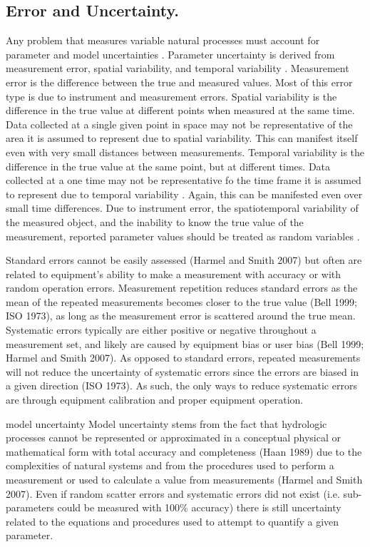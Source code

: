 \begin{linenumbers}
\section{Error and Uncertainty.}
\label{sec:ErrorAndUncertainty}

Any problem that measures variable natural processes must account for parameter and model uncertainties \parencite{vicens1975}.  Parameter uncertainty is derived from measurement error, spatial variability, and temporal variability \parencite{herschy2002}.  Measurement error is the difference between the true and measured values.  Most of this error type is due to instrument and measurement errors.    Spatial variability is the difference in the true value at different points when measured at the same time.  Data collected at a single given point in space may not be representative of the area it is assumed to represent due to spatial variability.  This can manifest itself even with very small distances between measurements.  Temporal variability is the difference in the true value at the same point, but at different times.  Data collected at a one time may not be representative fo the time frame it is assumed to represent due to temporal variability \parencite{Gates1996}.  Again, this can be manifested even over small time differences.  Due to instrument error, the spatiotemporal variability of the measured object, and the inability to know the true value of the measurement, reported parameter values should be treated as random variables \parencite{haan1989,haan2002}.

Standard errors cannot be easily assessed (Harmel and Smith 2007) but often are related to equipment’s ability to make a measurement with accuracy or with random operation errors.  Measurement repetition reduces standard errors as the mean of the repeated measurements becomes closer to the true value (Bell 1999; ISO 1973), as long as the measurement error is scattered around the true mean.
Systematic errors typically are either positive or negative throughout a measurement set, and likely are caused by equipment bias or user bias (Bell 1999; Harmel and Smith 2007).  As opposed to standard errors, repeated measurements will not reduce the uncertainty of systematic errors since the errors are biased in a given direction (ISO 1973).  As such, the only ways to reduce systematic errors are through equipment calibration and proper equipment operation.

	model uncertainty
Model uncertainty stems from the fact that hydrologic processes cannot be represented or approximated in a conceptual physical or mathematical form with total accuracy and completeness (Haan 1989) due to the complexities of natural systems and from the procedures used to perform a measurement or used to calculate a value from measurements (Harmel and Smith 2007).  Even if random scatter errors and systematic errors did not exist (i.e. sub-parameters could be measured with 100\% accuracy) there is still uncertainty related to the equations and procedures used to attempt to quantify a given parameter.


\end{linenumbers}
